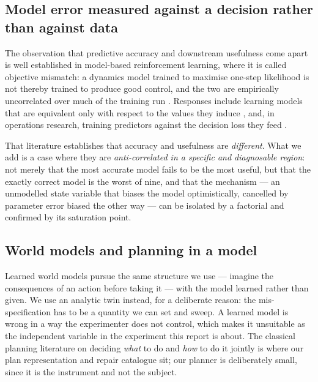 \documentclass[11pt,a4paper]{article}
\begin{document}
\subsection{Model error measured against a decision rather than against data}
The observation that predictive accuracy and downstream usefulness come apart is
well established in model-based reinforcement learning, where it is called
objective mismatch: a dynamics model trained to maximise one-step likelihood is
not thereby trained to produce good control, and the two are empirically
uncorrelated over much of the training run \citep{lambert2020objective}.
Responses include learning models that are equivalent only with respect to the
values they induce \citep{grimm2020value,farahmand2018iterative}, and, in
operations research, training predictors against the decision loss they feed
\citep{donti2017task,elmachtoub2022smart}.

That literature establishes that accuracy and usefulness are \emph{different}.
What we add is a case where they are \emph{anti-correlated in a specific and
diagnosable region}: not merely that the most accurate model fails to be the
most useful, but that the exactly correct model is the worst of nine, and that
the mechanism --- an unmodelled state variable that biases the model
optimistically, cancelled by parameter error biased the other way --- can be
isolated by a factorial and confirmed by its saturation point.

\subsection{World models and planning in a model}
Learned world models \citep{ha2018world,hafner2020dream,hafner2023mastering}
pursue the same structure we use --- imagine the consequences of an action
before taking it --- with the model learned rather than given. We use an
analytic twin instead, for a deliberate reason: the mis-specification has to be
a quantity we can set and sweep. A learned model is wrong in a way the
experimenter does not control, which makes it unsuitable as the independent
variable in the experiment this report is about. The classical planning
literature on deciding \emph{what} to do and \emph{how} to do it jointly
\citep{garrett2021integrated,kaelbling2013integrated} is where our plan
representation and repair catalogue sit; our planner is deliberately small, since
it is the instrument and not the subject.
\end{document}
